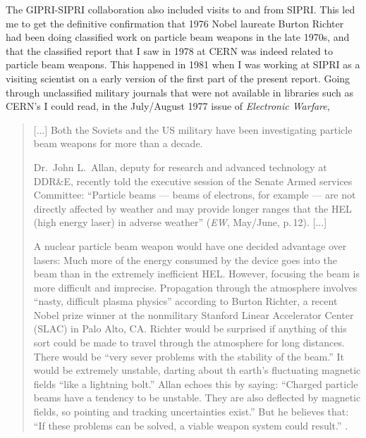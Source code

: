 \documentclass [12pt,a4paper,     ]{report} %
\begin{document}
  The GIPRI-SIPRI collaboration also included visits to and from SIPRI.  This led me to get the definitive confirmation that 1976 Nobel laureate Burton Richter had been doing classified work on particle beam weapons in the late 1970s, and that the classified report that I saw in 1978 at CERN was indeed related to particle beam weapons.  This happened in 1981 when I was working at SIPRI as a visiting scientist on a early version of the first part of the present report.  Going through unclassified military journals that were not available in libraries such as CERN's I could read, in the July/August 1977 issue of \emph{Electronic Warfare},
%
\begin{quote}

[...] Both the Soviets and the US military have been investigating particle beam weapons for more than a decade.

Dr.\ John L.\ Allan, deputy for research and advanced technology at DDR\&E, recently told the executive session of the Senate Armed services Committee: ``Particle beams --- beams of electrons, for example --- are not directly affected by weather and may provide longer ranges that the HEL (high energy laser) in adverse weather'' (\emph{EW}, May/June, p.\,12). [...]

A nuclear particle beam weapon would have one decided advantage over lasers: Much more of the energy consumed by the device goes into the beam than in the extremely inefficient HEL.  However, focusing the beam is more difficult and imprecise.  Propagation through the atmosphere involves ``nasty, difficult plasma physics'' according to Burton Richter, a recent Nobel prize winner at the nonmilitary Stanford Linear Accelerator Center (SLAC) in Palo Alto, CA.  Richter would be surprised if anything of this sort could be made to travel through the atmosphere for long distances.  There would be ``very sever problems with the stability of the beam.''  It would be extremely unstable, darting about th earth's fluctuating magnetic fields ``like a lightning bolt.''  Allan echoes this by saying: ``Charged particle beams have a tendency to be unstable.  They are also deflected by magnetic fields, so pointing and tracking uncertainties exist.'' But he believes that: ``If these problems can be solved, a viable weapon system could result.''  \cite[p.\,31-32]{EW-JF1977-}.

\end{quote}
\end{document}
